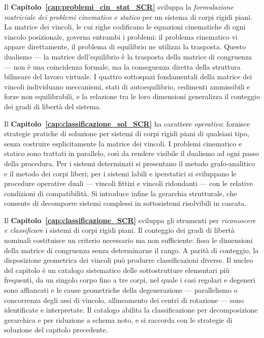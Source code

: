 Il \textbf{Capitolo~\ref{cap:problemi_cin_stat_SCR}} sviluppa la \emph{formulazione
	matriciale dei problemi cinematico e statico} per un sistema di corpi rigidi piani. La
matrice dei vincoli, le cui righe codificano le equazioni cinematiche di ogni vincolo
posizionale, governa entrambi i problemi: il problema cinematico vi appare direttamente,
il problema di equilibrio ne utilizza la trasposta. Questo dualismo --- la matrice
dell'equilibrio è la trasposta della matrice di congruenza --- non è una coincidenza
formale, ma la conseguenza diretta della struttura bilineare del lavoro virtuale.
I quattro sottospazi fondamentali della matrice dei vincoli individuano meccanismi,
stati di autoequilibrio, cedimenti ammissibili e forze non equilibrabili, e la relazione
tra le loro dimensioni generalizza il conteggio dei gradi di libertà del sistema.

Il \textbf{Capitolo~\ref{cap:classificazione_sol_SCR}} ha carattere \emph{operativo}:
fornisce strategie pratiche di soluzione per sistemi di corpi rigidi piani di qualsiasi
tipo, senza costruire esplicitamente la matrice dei vincoli. I problemi cinematico e
statico sono trattati in parallelo, così da rendere visibile il dualismo ad ogni passo
della procedura. Per i sistemi determinati si presentano il metodo grafo-analitico e
il metodo dei corpi liberi; per i sistemi labili e iperstatici si sviluppano le procedure
operative duali --- vincoli fittizi e vincoli ridondanti --- con le relative condizioni
di compatibilità. Si introduce infine la gerarchia strutturale, che consente di
decomporre sistemi complessi in sottosistemi risolvibili in cascata.

Il \textbf{Capitolo~\ref{cap:classificazione_SCR}} sviluppa gli strumenti per
\emph{riconoscere e classificare} i sistemi di corpi rigidi piani. Il conteggio
dei gradi di libertà nominali costituisce un criterio necessario ma non sufficiente:
fissa le dimensioni della matrice di congruenza senza determinarne il rango. A parità
di conteggio, la disposizione geometrica dei vincoli può produrre classificazioni
diverse. Il nucleo del capitolo è un catalogo sistematico delle sottostrutture
elementari più frequenti, da un singolo corpo fino a tre corpi, nel quale i casi
regolari e degeneri sono affiancati e le cause geometriche della degenerazione ---
parallelismo o concorrenza degli assi di vincolo, allineamento dei centri di
rotazione --- sono identificate e interpretate. Il catalogo abilita la classificazione
per decomposizione gerarchica e per riduzione a schema noto, e si raccorda con le
strategie di soluzione del capitolo precedente.

